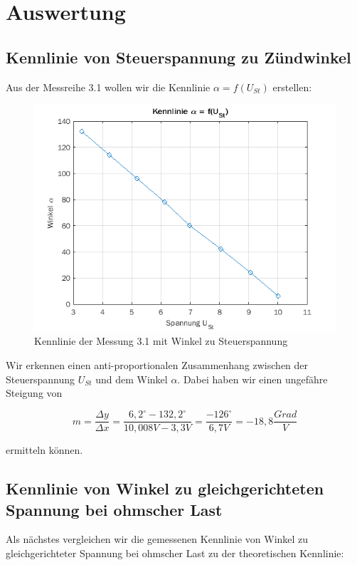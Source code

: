 \documentclass{article}
\begin{document}
\section{Auswertung}

\subsection{Kennlinie von Steuerspannung zu Zündwinkel}
\label{sec:kennl-von-steu}

Aus der Messreihe 3.1 wollen wir die Kennlinie $\alpha = f(U_{St})$ erstellen:

\begin{figure}[h]
  \centering
  \includegraphics[width=.75\textwidth]{../assets/images/GEP2/alpha_ust.png}
  \caption{Kennlinie der Messung 3.1 mit Winkel zu Steuerspannung}
  \label{fig:alphaust}
\end{figure}

Wir erkennen einen anti-proportionalen Zusammenhang zwischen der Steuerspannung $U_{St}$ und dem Winkel $\alpha$. Dabei haben wir einen ungefähre Steigung von

\begin{equation*}
  m = \frac{\Delta y}{\Delta x} = \frac{6,2^{\circ} - 132,2^{\circ}}{10,008V - 3,3V} = \frac{-126^{\circ}}{6,7V} = -18,8 \frac{Grad}{V}
\end{equation*}

ermitteln können.
\newpage
\subsection{Kennlinie von Winkel zu gleichgerichteten Spannung bei ohmscher Last}
\label{sec:kennlinie-von-winkel}

Als nächstes vergleichen wir die gemessenen Kennlinie von Winkel zu gleichgerichteter Spannung bei ohmscher Last zu der theoretischen Kennlinie:
\end{document}
